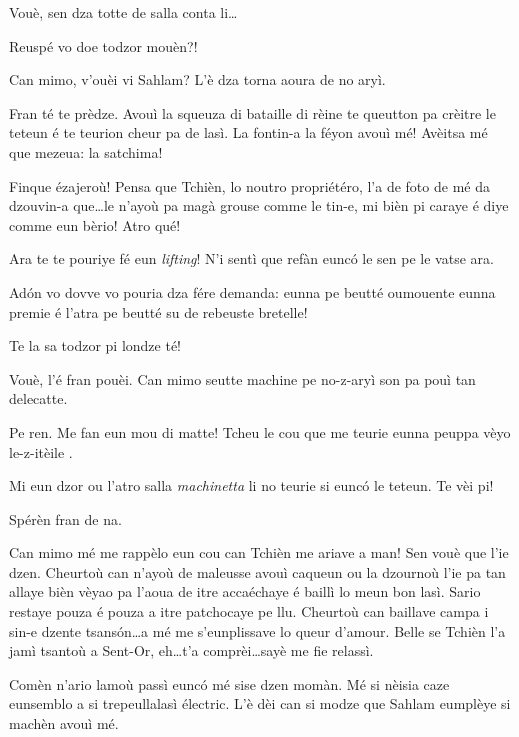 \begin{drama}
\Piccinaspeaks Vouè, sen dza totte de salla conta li\ldots

\Tzardounspeaks Reuspé vo doe todzor mouèn?!

\Cobraspeaks Can mimo, v'ouèi vi Sahlam? L’è dza torna aoura de no aryì.

\Piccinaspeaks Fran té te prèdze. Avouì la squeuza di bataille di rèine te queutton pa crèitre le teteun é te teurion cheur pa de lasì\latte. La fontin-a la féyon avouì mé!  Avèitsa mé que mezeua: la satchima!

\Tzardounspeaks Finque ézajeroù! Pensa que Tchièn, lo noutro propriétéro, l’a de foto de mé da dzouvin-a que\ldots le n’ayoù pa magà grouse comme le tin-e, mi bièn pi caraye é diye comme eun bèrio! Atro qué!


\Piccinaspeaks  {} Ara te te pouriye fé eun \textit{lifting}! N’i sentì que refàn eunc\'o le sen pe le vatse ara.
 

\Tzardounspeaks Ad\'on vo dovve vo pouria dza fére demanda: eunna  pe beutté oumouente eunna premie é l’atra pe beutté su de rebeuste bretelle!

\Piccinaspeaks Te la sa todzor pi londze té! 

\Tzardounspeaks Vouè, l’é fran pouèi. Can mimo seutte machine pe no-z-aryì son pa pouì tan delecatte.

\Piccinaspeaks Pe ren. Me fan eun mou di matte! Tcheu le cou que me teurie eunna peuppa vèyo le-z-itèile \stella \dolore \stella \dolore \stella .

\Tzardounspeaks Mi eun dzor ou l’atro salla \textit{machinetta} li no teurie si eunc\'o le teteun. Te vèi pi!

\Piccinaspeaks Spérèn fran de na.

\Tzardounspeaks Can mimo mé me rappèlo eun cou can Tchièn me ariave a man! Sen vouè que l'ie dzen. Cheurtoù can n’ayoù de maleusse avouì caqueun ou la dzournoù l'ie pa tan allaye bièn vèyao pa l’aoua de itre accaéchaye é baillì lo meun bon lasì. Sario restaye pouza é pouza a itre patchocaye pe llu. Cheurtoù can baillave campa i sin-e dzente tsans\'on\ldots a mé me s’eunplissave lo queur d’amour. Belle se Tchièn l’a jamì tsantoù a Sent-Or,  eh\ldots t’a comprèi\ldots sayè me fie relassì.

\Piccinaspeaks Comèn n’ario lamoù passì eunc\'o mé sise dzen momàn. Mé si nèisia caze eunsemblo a si trepeullalasì électric. L’è dèi can si modze que Sahlam eumplèye si machèn avouì mé.


\end{drama}
